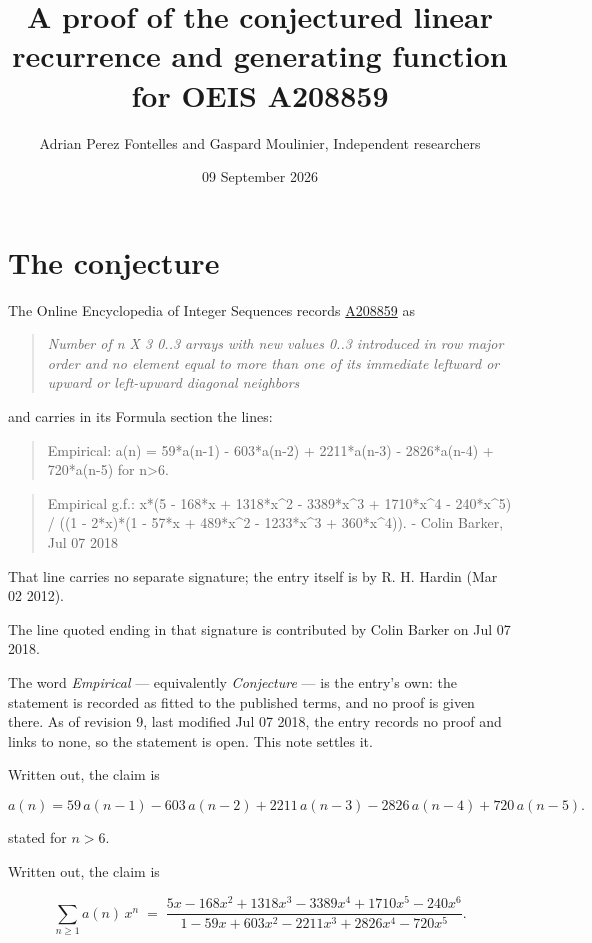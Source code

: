 \documentclass[11pt]{article}
\title{A proof of the conjectured linear recurrence and generating function for OEIS A208859}
\author{Adrian Perez Fontelles and Gaspard Moulinier, Independent researchers}
\date{09 September 2026}
\theoremstyle{definition}
\begin{document}
\maketitle
\section{The conjecture}

The Online Encyclopedia of Integer Sequences records \href{https://oeis.org/A208859}{A208859} as

\begin{quote}\itshape Number of n X 3 0..3 arrays with new values 0..3 introduced in row major order and no element equal to more than one of its immediate leftward or upward or left-upward diagonal neighbors\end{quote}

and carries in its Formula section the lines:

\begin{quote}\ttfamily Empirical: a(n) = 59*a(n-1) - 603*a(n-2) + 2211*a(n-3) - 2826*a(n-4) + 720*a(n-5) for n>6.\end{quote}

\begin{quote}\ttfamily Empirical g.f.: x*(5 - 168*x + 1318*x\textasciicircum{}2 - 3389*x\textasciicircum{}3 + 1710*x\textasciicircum{}4 - 240*x\textasciicircum{}5) / ((1 - 2*x)*(1 - 57*x + 489*x\textasciicircum{}2 - 1233*x\textasciicircum{}3 + 360*x\textasciicircum{}4)). - Colin Barker, Jul 07 2018\end{quote}

That line carries no separate signature; the entry itself is by R. H. Hardin (Mar 02 2012).

The line quoted ending in that signature is contributed by Colin Barker on Jul 07 2018.

The word {\itshape Empirical} --- equivalently {\itshape Conjecture} --- is the entry's own: the statement is recorded as fitted to the published terms, and no proof is given there. As of revision 9, last modified Jul 07 2018, the entry records no proof and links to none, so the statement is open. This note settles it.

Written out, the claim is

\[a(n) = 59\,a(n-1) - 603\,a(n-2) + 2211\,a(n-3) - 2826\,a(n-4) + 720\,a(n-5).\]

stated for $n > 6$.

Written out, the claim is

\[\sum_{n \ge 1} a(n)\,x^n \;=\; \frac{5x - 168x^{2} + 1318x^{3} - 3389x^{4} + 1710x^{5} - 240x^{6}}{1 - 59x + 603x^{2} - 2211x^{3} + 2826x^{4} - 720x^{5}}.\]
\end{document}
